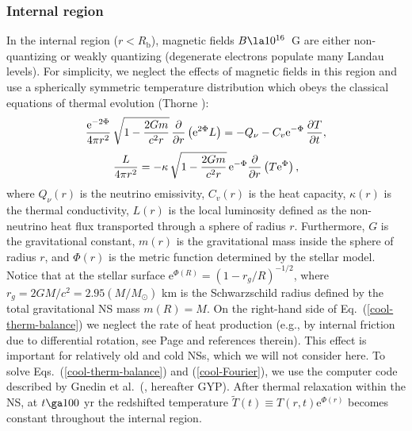 \documentclass{aa}
\begin{document}
\subsubsection{Internal region}
%
In the internal region ($r<R_\mathrm{b}$), 
magnetic fields $B \la 10^{16}$~G are either non-quantizing or
weakly quantizing (degenerate electrons populate many Landau levels).
For simplicity, we neglect the effects
of magnetic fields in this region and
use a spherically symmetric temperature
distribution which obeys the classical
equations of thermal evolution (Thorne \cite{thorne}):
%
\begin{equation}
    { \mathrm{e}^{-2\Phi } \over 4 \pi r^2 } \,
    \sqrt{1 - {2 G m  \over c^2 r}} \,
    { \partial  \over \partial  r}
    \left( \mathrm{e}^{2 {\Phi }} L \right)
    = -Q_\nu - {C_v  \mathrm{e}^{-\Phi }} \,
     {\partial T \over \partial t},
  \label{cool-therm-balance}
\end{equation}
\begin{equation}
    {L \over 4 \pi r^2} =
    -  \kappa \,\sqrt{1 - {2Gm  \over c^2 r}} \, \mathrm{e}^{-{\Phi }}
    {\partial \over \partial r} \left( T \mathrm{e}^{\Phi } \right),
  \label{cool-Fourier}
\end{equation}
%
where $Q_\nu(r)$ is the neutrino emissivity, 
$C_v(r)$ is the heat capacity, $\kappa(r)$ is the
thermal conductivity, $L(r)$ is the local luminosity defined as
the non-neutrino heat flux transported through a sphere of radius $r$.
Furthermore, $G$ is the gravitational constant,
$m(r)$ is the gravitational mass inside the sphere of radius $r$,
and $\Phi(r)$ is the metric function
determined by the stellar model.  
Notice that at the stellar surface
$\mathrm{e}^{\Phi(R)}=(1-r_g/R)^{-1/2}$,
where
$r_g=2GM/c^2=2.95(M/M_\odot)$ km is the Schwarzschild radius
defined by the total gravitational NS mass $m(R)=M$.
On the right-hand side of 
Eq.~(\ref{cool-therm-balance}) we neglect
the rate of heat production (e.g., by internal friction
due to differential rotation, see Page \cite{page97,page98}
and references therein). This
effect is important for relatively
old and cold NSs, which we will not consider here.
To solve Eqs.~(\ref{cool-therm-balance}) and (\ref{cool-Fourier}),
we use the computer code described 
by Gnedin et al.\ (\cite{gyp}, hereafter GYP).
After thermal relaxation within the NS,
at $t \ga 100$ yr the
redshifted temperature 
$\widetilde{T}(t) \equiv T(r,t)\mathrm{e}^{\Phi(r)}$ 
becomes constant throughout the internal region.
\end{document}
